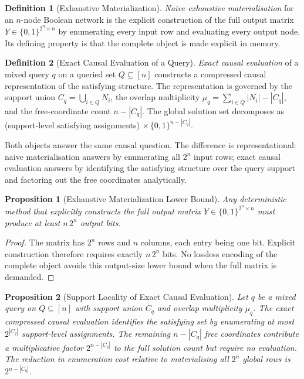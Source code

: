 \documentclass[11pt]{article}
\newtheorem{proposition}{Proposition}
\theoremstyle{definition}
\newtheorem{definition}{Definition}
\begin{document}
\begin{definition}[Exhaustive Materialization]\label{def:exhaustive-mat}
\emph{Naive exhaustive materialisation} for an \(n\)-node Boolean network is the explicit
construction of the full output matrix \(Y\in\{0,1\}^{2^n\times n}\) by enumerating every input
row and evaluating every output node. Its defining property is that the complete object is made
explicit in memory.
\end{definition}

\begin{definition}[Exact Causal Evaluation of a Query]\label{def:causal-eval}
\emph{Exact causal evaluation} of a mixed query \(q\) on a queried set \(Q\subseteq[n]\) constructs
a compressed causal representation of the satisfying structure. The representation is governed by
the support union \(C_q=\bigcup_{i\in Q}N_i\), the overlap multiplicity
\(\mu_q=\sum_{i\in Q}|N_i|-|C_q|\), and the free-coordinate count \(n-|C_q|\). The global solution
set decomposes as (support-level satisfying assignments) \(\times\,\{0,1\}^{n-|C_q|}\).
\end{definition}

Both objects answer the same causal question. The difference is representational: naive
materialisation answers by enumerating all \(2^n\) input rows; exact causal evaluation answers by
identifying the satisfying structure over the query support and factoring out the free coordinates
analytically.

\begin{proposition}[Exhaustive Materialization Lower Bound]\label{prop:materialization-lb}
Any deterministic method that explicitly constructs the full output matrix
\(Y\in\{0,1\}^{2^n\times n}\) must produce at least \(n\,2^n\) output bits.
\end{proposition}

\begin{proof}
The matrix has \(2^n\) rows and \(n\) columns, each entry being one bit. Explicit construction
therefore requires exactly \(n\,2^n\) bits. No lossless encoding of the complete object avoids
this output-size lower bound when the full matrix is demanded.
\end{proof}

\begin{proposition}[Support Locality of Exact Causal Evaluation]\label{prop:support-locality}
Let \(q\) be a mixed query on \(Q\subseteq[n]\) with support union \(C_q\) and overlap multiplicity
\(\mu_q\). The exact compressed causal evaluation identifies the satisfying set by enumerating at
most \(2^{|C_q|}\) support-level assignments. The remaining \(n-|C_q|\) free coordinates contribute
a multiplicative factor \(2^{n-|C_q|}\) to the full solution count but require no evaluation. The
reduction in enumeration cost relative to materialising all \(2^n\) global rows is
\(2^{n-|C_q|}\).
\end{proposition}
\end{document}
